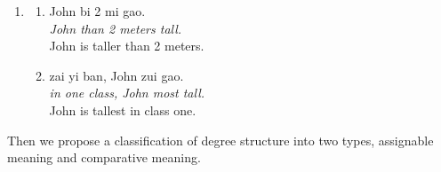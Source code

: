 \documentclass{ctexart}
\begin{document}
\begin{enumerate}[resume]
    \item
    \begin{enumerate}[ref=(\arabic{enumi}\alph*)]
        \item \label{specific_value_comparison_example}
        John bi 2 mi gao.\\
        \textit{John than 2 meters tall.} \\
        John is taller than 2 meters.

        \item \label{individual_set_comparison_example}
        zai yi ban, John zui gao.\\
        \textit{in one class, John most tall.}\\
        John is tallest in class one.

    \end{enumerate}
\end{enumerate}

Then we propose a classification of degree structure into two types, assignable meaning and comparative meaning.
\end{document}
